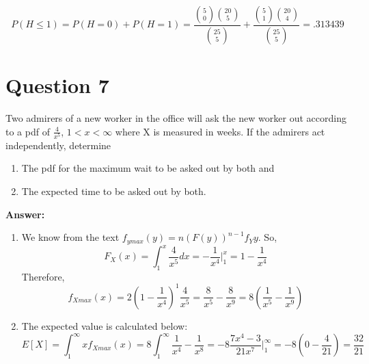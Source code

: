 \documentclass[svgnames]{article}
\begin{document}
$$P(H \leq 1)= P(H=0) + P(H=1) = \frac{\binom{5}{0}\binom{20}{5}}{\binom{25}{5} }+\frac{\binom{5}{1}\binom{20}{4}}{ \binom{25}{5}}=.313439$$ 

\section{Question 7}
Two admirers of a new worker in the office will ask the new worker out according to a pdf of $\frac{4}{x^5}$, $1<x<\infty$ where X is measured in weeks. If the admirers act independently,
determine 
\begin{enumerate}[label = (\alph*)]
\item
The pdf for the maximum wait to be asked out by both and 
\item 
The expected time to be asked out by both.
\end{enumerate}
\textbf{Answer:}
\newline
\newline
\begin{enumerate}[label = (\alph*)]
\item
We know from the text $f_{ymax}(y)=n(F(y))^{n-1}f_Y{y}$.
\newline
So,
$$F_{X}(x)=\int_{1}^{x}\frac{4}{x^5}dx=-\frac{1}{x^4}\Big|^{x}_{1}=1-\frac{1}{x^4}$$
Therefore,
$$f_{Xmax}(x)=2(1-\frac{1}{x^4})^{1}\frac{4}{x^5}=\frac{8}{x^5} - \frac{8}{x^9}=8(\frac{1}{x^5}-\frac{1}{x^9})$$

\item
The expected value is calculated below:
$$E[X]=\int^{\infty}_{1}xf_{Xmax}(x)=8\int^{\infty}_{1}\frac{1}{x^4}-\frac{1}{x^8}=-8\frac{7x^4-3}{21x^7}\Big|_{1}^{\infty}=-8(0 - \frac{4}{21})=\frac{32}{21}$$
\end{enumerate}
\end{document}
